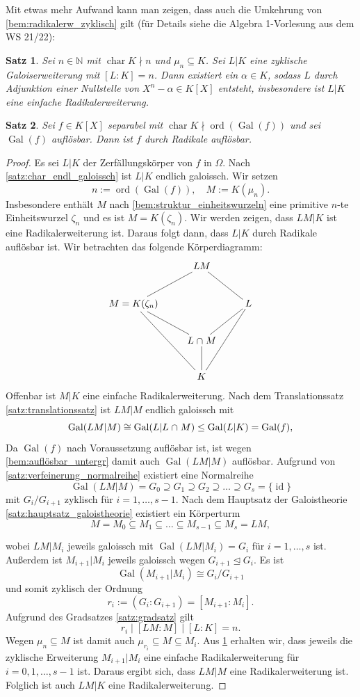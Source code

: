 \documentclass[a4paper, twoside, 11pt, ngerman]{report}
\newcommand{\NN}{\mathds N}
\DeclareMathOperator{\charact}{char}
\DeclareMathOperator{\Gal}{Gal}
\DeclareMathOperator{\ord}{ord}
\renewcommand{\cap}{\;\rotatebox{90}{\reflectbox{\rotatebox{270}{$\cup$}}}\;}
\theoremstyle{definistyle}
\newtheorem{satz}{Satz}[section]
\theoremstyle{remark}
\begin{document}
Mit etwas mehr Aufwand kann man zeigen, dass auch die Umkehrung von \ref{bem:radikalerw_zyklisch} gilt (für Details siehe die Algebra 1-Vorlesung aus
dem WS 21/22):
\begin{satz}\label{satz:radikalerweiterung}
Sei $n \in \NN$ mit $\charact K \nmid n$ und $\mu_n \subseteq K$. Sei $L | K$ eine zyklische Galoiserweiterung mit $[L : K] = n$.
Dann existiert ein $\alpha \in K$, sodass $L$ durch Adjunktion einer Nullstelle von $X^n - \alpha \in K[X]$ entsteht, insbesondere ist $L | K$ eine einfache Radikalerweiterung.
\end{satz}

\begin{satz}\label{satz:radikal_aufloesbar}
Sei $f \in K[X]$ separabel mit $\charact K \nmid \ord(\Gal(f))$ und sei $\Gal(f)$ auflösbar.
Dann ist $f$ durch Radikale auflösbar.
\end{satz}
\begin{proof}
Es sei $L|K$ der Zerfällungskörper von $f$ in $\Omega$. Nach \ref{satz:char_endl_galoissch} ist $L|K$ endlich galoissch. Wir setzen 
\[
n := \ord(\Gal(f)), \quad M := K(\mu_n).
\]
Insbesondere enthält $M$ nach \ref{bem:struktur_einheitswurzeln} eine primitive $n$-te Einheitswurzel $\zeta_n$ und es ist $M=K(\zeta_n)$. Wir werden zeigen, dass $L M|K$ ist eine Radikalerweiterung ist. Daraus folgt dann, dass $L|K$ durch Radikale auflösbar ist.
Wir betrachten das folgende Körperdiagramm:
\[
\xymatrix{
& LM \ar@{-}[dl] \ar@{-}[dr] & \\
M = K(\zeta_n) \ar@{-}[dr] \ar@{-}[ddr]& & L \ar@{-}[dl] \ar@{-}[ddl]\\
& L \cap M \ar@{-}[d] & \\
& K &
}
\]
Offenbar ist $M|K$ eine einfache Radikalerweiterung. Nach dem Translationssatz \ref{satz:translationssatz} ist $LM|M$ endlich galoissch mit
\[
\Gal(LM|M) \cong \Gal(L|L \cap M) \leq \Gal(L|K) = \Gal(f),
\]
Da $\Gal(f)$ nach Voraussetzung auflösbar ist, ist wegen \ref{bem:auflösbar_untergr} damit auch $\Gal(LM|M)$ auflösbar. Aufgrund von \ref{satz:verfeinerung_normalreihe} existiert eine Normalreihe
\[
\Gal(LM|M) = G_0 \supseteq G_1 \supseteq G_2 \supseteq \ldots \supseteq G_s = \{\operatorname{id}\}
\]
mit $G_i / G_{i+1}$ zyklisch für $i = 1, \dots, s-1$.
Nach dem Hauptsatz der Galoistheorie \ref{satz:hauptsatz_galoistheorie} existiert ein Körperturm
\[
M = M_0 \subseteq M_1 \subseteq \dots \subseteq M_{s-1} \subseteq M_s = LM,
\]

wobei $LM|M_i$ jeweils galoissch mit $\Gal(LM|M_i) = G_i$ für $i = 1, \dots, s$ ist. 
Außerdem ist $M_{i+1}|M_i$ jeweils galoissch wegen $G_{i+1} \trianglelefteq G_i$.
Es ist
\[
\Gal(M_{i+1}|M_i) \cong G_i / G_{i+1} 
\]
und somit zyklisch der Ordnung \[r_i := (G_i : G_{i+1}) = [M_{i+1} : M_i].\]
Aufgrund des Gradsatzes \ref{satz:gradsatz} gilt
\[
r_i \mid [LM : M]\mid [L : K] = n.
\]
Wegen $\mu_n \subseteq M$ ist damit auch $\mu_{r_i} \subseteq M \subseteq M_i$.
Aus \ref{satz:radikalerweiterung} erhalten wir, dass jeweils die zyklische Erweiterung $M_{i+1}|M_i$ eine einfache Radikalerweiterung für $i = 0, 1, \dots, s-1$ ist.
Daraus ergibt sich, dass $LM|M$ eine Radikalerweiterung ist. Folglich ist auch $LM|K$ eine Radikalerweiterung.
\end{proof}
\end{document}
